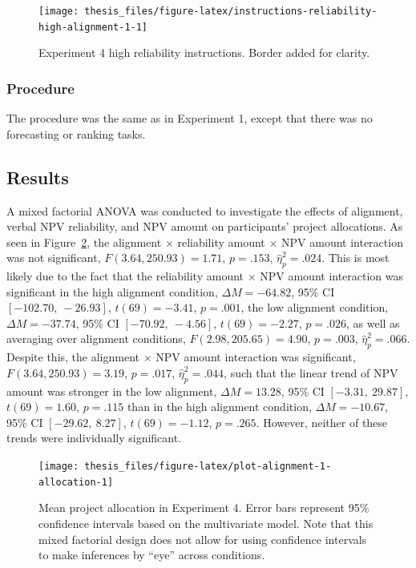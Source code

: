\documentclass[a4paper, nobind, dvipsnames]{templates/ociamthesis}
\theoremstyle{definition}
\theoremstyle{definition}
\theoremstyle{definition}
\theoremstyle{definition}
\theoremstyle{remark}
\begin{document}
\begin{figure}
\texttt{[image: thesis\_files/figure-latex/instructions-reliability-high-alignment-1-1]} \caption{Experiment 4 high reliability instructions. Border added for clarity.}\label{fig:instructions-reliability-high-alignment-1}
\end{figure}

\subsubsection{Procedure}

The procedure was the same as in Experiment 1, except that there was no
forecasting or ranking tasks.

\hypertarget{results-alignment-1}{%
\subsection{Results}\label{results-alignment-1}}

A mixed factorial ANOVA was conducted to investigate the effects of alignment,
verbal NPV reliability, and NPV amount on participants' project allocations. As
seen in Figure~\ref{fig:plot-alignment-1-allocation}, the alignment \(\times\)
reliability amount \(\times\) NPV amount interaction was not significant,
\(F(3.64, 250.93) = 1.71\), \(p = .153\), \(\hat{\eta}^2_p = .024\). This
is most likely due to the fact that the reliability amount \(\times\) NPV amount
interaction was significant in the high alignment condition,
\(\Delta M = -64.82\), 95\% CI \([-102.70,~-26.93]\), \(t(69) = -3.41\), \(p = .001\), the low alignment
condition, \(\Delta M = -37.74\), 95\% CI \([-70.92,~-4.56]\), \(t(69) = -2.27\), \(p = .026\), as well as
averaging over alignment conditions,
\(F(2.98, 205.65) = 4.90\), \(p = .003\), \(\hat{\eta}^2_p = .066\). Despite this,
the alignment \(\times\) NPV amount interaction was significant,
\(F(3.64, 250.93) = 3.19\), \(p = .017\), \(\hat{\eta}^2_p = .044\), such that the linear
trend of NPV amount was stronger in the low alignment,
\(\Delta M = 13.28\), 95\% CI \([-3.31,~29.87]\), \(t(69) = 1.60\), \(p = .115\) than in the high alignment
condition, \(\Delta M = -10.67\), 95\% CI \([-29.62,~8.27]\), \(t(69) = -1.12\), \(p = .265\). However, neither of
these trends were individually significant.



\begin{figure}
\texttt{[image: thesis\_files/figure-latex/plot-alignment-1-allocation-1]} \caption{Mean project allocation in Experiment 4. Error bars represent 95\% confidence intervals based on the multivariate model. Note that this mixed factorial design does not allow for using confidence intervals to make inferences by ``eye'' across conditions.}\label{fig:plot-alignment-1-allocation}
\end{figure}
\end{document}
